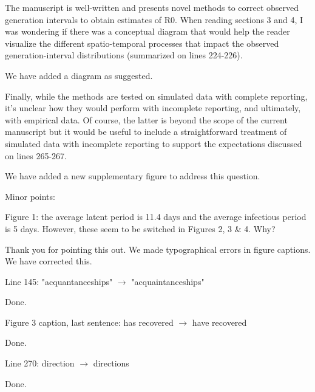 \documentclass[12pt]{article}
\newcommand{\revtext}{\textsf}
\begin{document}
\revtext{
The manuscript is well-written and presents novel methods to correct observed generation intervals to obtain estimates of R0. When reading sections 3 and 4, I was wondering if there was a conceptual diagram that would help the reader visualize the different spatio-temporal processes that impact the observed generation-interval distributions (summarized on lines 224-226).}

We have added a diagram as suggested.

\revtext{Finally, while the methods are tested on simulated data with complete reporting, it's unclear how they would perform with incomplete reporting, and ultimately, with empirical data. Of course, the latter is beyond the scope of the current manuscript but it would be useful to include a straightforward treatment of simulated data with incomplete reporting to support the expectations discussed on lines 265-267.}

We have added a new supplementary figure to address this question.

\revtext{Minor points:}

\revtext{Figure 1: the average latent period is 11.4 days and the average infectious period is 5 days. However, these seem to be switched in Figures 2, 3 \& 4. Why?}

Thank you for pointing this out. We made typographical errors in figure captions. We have corrected this.

\revtext{Line 145: "acquantanceships" $\rightarrow$ "acquaintanceships"}

Done.

\revtext{Figure 3 caption, last sentence: has recovered $\rightarrow$ have recovered}

Done.

\revtext{Line 270: direction $\rightarrow$ directions }

Done.


\end{document}
